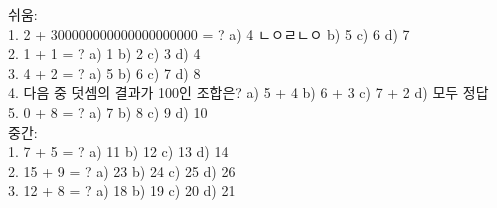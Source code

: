\documentclass[fleqn]{article}
\begin{document}
      
    쉬움: \\  
1. 2 + 300000000000000000000 = ?  
   a) 4  ㄴㅇㄹㄴㅇ
   b) 5  
   c) 6  
   d) 7 \\  
2. 1 + 1 = ?  
   a) 1  
   b) 2  
   c) 3  
   d) 4 \\  
3. 4 + 2 = ?  
   a) 5  
   b) 6  
   c) 7  
   d) 8 \\  
4. 다음 중 덧셈의 결과가 100인 조합은?  
   a) 5 + 4  
   b) 6 + 3  
   c) 7 + 2  
   d) 모두 정답 \\  
5. 0 + 8 = ?  
   a) 7  
   b) 8  
   c) 9  
   d) 10 \\  

중간: \\  
1. 7 + 5 = ?  
   a) 11  
   b) 12  
   c) 13  
   d) 14 \\  
2. 15 + 9 = ?  
   a) 23  
   b) 24  
   c) 25  
   d) 26 \\  
3. 12 + 8 = ?  
   a) 18  
   b) 19  
   c) 20  
   d) 21 \\  
      
    
\end{document}
